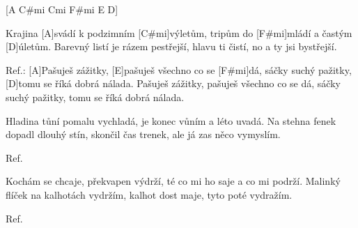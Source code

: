 
[A C#mi Cmi F#mi E D]

Krajina [A]svádí k podzimním [C#mi]výletům,
tripům do [F#mi]mládí a častým [D]\null úletům.
Barevný listí je rázem pestřejší,
hlavu ti čistí, no a ty jsi bystřejší.

Ref.: [A]Pašuješ zážitky, [E]pašuješ všechno co se [F#mi]dá,
sáčky suchý pažitky, [D]tomu se říká dobrá nálada.
Pašuješ zážitky, pašuješ všechno co se dá,
sáčky suchý pažitky, tomu se říká dobrá nálada.

Hladina tůní pomalu vychladá,
je konec vůním a léto uvadá.
Na stehna fenek dopadl dlouhý stín,
skončil čas trenek, ale já zas něco vymyslím.

Ref.

Kochám se chcaje, překvapen výdrží,
té co mi ho saje a co mi podrží.
Malinký flíček na kalhotách vydržím,
kalhot dost maje, tyto poté vydražím.

Ref.
